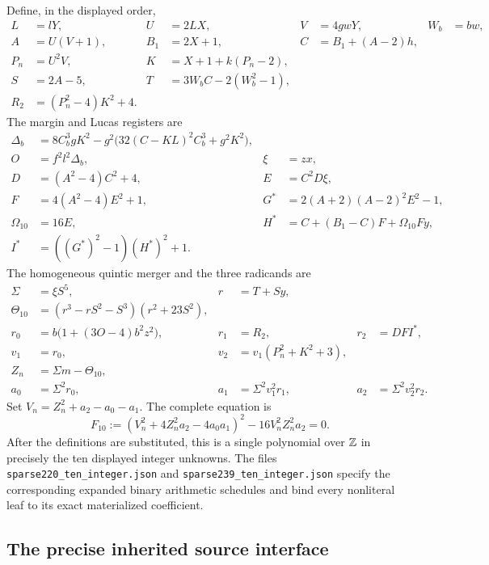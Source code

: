 Define, in the displayed order,
\begin{align*}
 L&=lY,&U&=2LX,&V&=4gwY,&W_b&=bw,\\
 A&=U(V+1),&B_1&=2X+1,&C&=B_1+(A-2)h,\\
 P_n&=U^2V,&K&=X+1+k(P_n-2),\\
 S&=2A-5,&T&=3W_bC-2(W_b^2-1),\\
 R_2&=(P_n^2-4)K^2+4.
\end{align*}
The margin and Lucas registers are
\begin{align*}
 \Delta_b&=8C_b^3gK^2-
       g^2\bigl(32(C-KL)^2C_b^3+g^2K^2\bigr),\\
 O&=f^2l^2\Delta_b,&\xi&=zx,\\
 D&=(A^2-4)C^2+4,&E&=C^2D\xi,\\
 F&=4(A^2-4)E^2+1,
 &G^*&=2(A+2)(A-2)^2E^2-1,\\
 \Omega_{10}&=16E,
 &H^*&=C+(B_1-C)F+\Omega_{10}Fy,\\
 I^*&=((G^*)^2-1)(H^*)^2+1.
\end{align*}
The homogeneous quintic merger and the three radicands are
\begin{align*}
 \Sigma&=\xi S^5,&r&=T+Sy,\\
 \Theta_{10}&=(r^3-rS^2-S^3)(r^2+23S^2),\\
 r_0&=b\bigl(1+(3O-4)b^2z^2\bigr),&
 r_1&=R_2,&r_2&=DFI^*,\\
 v_1&=r_0,&v_2&=v_1(P_n^2+K^2+3),\\
 Z_n&=\Sigma m-\Theta_{10},\\
 a_0&=\Sigma^2r_0,&a_1&=\Sigma^2v_1^2r_1,
 &a_2&=\Sigma^2v_2^2r_2.
\end{align*}
Set $V_n=Z_n^2+a_2-a_0-a_1$.  The complete equation is
\begin{equation}
 \boxed{\quad
 F_{10}:=(V_n^2+4Z_n^2a_2-4a_0a_1)^2
              -16V_n^2Z_n^2a_2=0.\quad}
 \label{eq:supplement-F10}
\end{equation}
After the definitions are substituted, this is a single polynomial over
$\mathbb Z$ in precisely the ten displayed integer unknowns.  The files
\texttt{sparse220\_ten\_integer.json} and
\texttt{sparse239\_ten\_integer.json} specify the corresponding expanded
binary arithmetic schedules and bind every nonliteral leaf to its exact
materialized coefficient.

\subsection{The precise inherited source interface}

